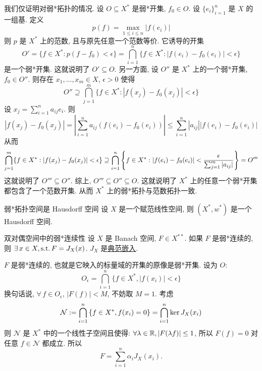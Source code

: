         \begin{prf}
            我们仅证明对弱*拓扑的情况. 设 \(O\subseteq X^*\) 是弱*开集, \(f_0\in O\). 设 \(\{e_i\}_{i=1}^n\) 是 \(X\) 的一组基. 定义
            \[p(f) = \max_{1\leq i\leq n} |f(e_i)|\]
            则 \(p\) 是 \(X^*\) 上的范数, 且与原先任意一个范数等价. 它诱导的开集
            \[O'=\{f\in X^*: p(f-f_0)<\epsilon\} = \bigcap_{i=1}^n \{f\in X^*: |f(e_i)-f_0(e_i)|<\epsilon\}\]
            是一个弱*开集. 这就说明了 \(O'\subseteq O\). 另一方面, 设 \(O''\) 是 \(X^*\) 上的一个弱*开集, \(f_0\in O''\). 则存在 \(x_1,\dots,x_m\in X\), \(\epsilon>0\) 使得
            \[O''\supseteq\bigcap_{j=1}^m \{f\in X^*: |f(x_j)-f_0(x_j)|<\epsilon\}\]
            设 \(x_j=\sum_{i=1}^n a_{ij} e_i\). 则
            \[|f(x_j)-f_0(x_j)| = \left|\sum_{i=1}^n a_{ij} (f(e_i)-f_0(e_i))\right| \leq \sum_{i=1}^n |a_{ij}| |f(e_i)-f_0(e_i)|\]
            从而
            \[\bigcap_{j=1}^m \{f\in X^*: |f(x_j)-f_0(x_j)|<\epsilon\} \supseteq \bigcap_{i=1}^n \qty{f\in X^*: |f(e_i)-f_0(e_i)|<\frac{\epsilon}{\sum_{j=1}^m |a_{ij}|}} = O'''\]
            这就说明了 \(O'''\subseteq O''\). 综上, \(O'''\subseteq O''\subseteq O\). 这就说明了 \(X^*\) 上的任意一个弱*开集都包含了一个范数开集. 从而 \(X^*\) 上的弱*拓扑与范数拓扑一致.
        \end{prf}

        \begin{ppt}
            {弱*拓扑空间是 Hausdorff 空间}
            设 \(X\) 是一个赋范线性空间, 则 \((X^*, w^*)\) 是一个 Hausdorff 空间.
        \end{ppt}

        \begin{ppt}
            {双对偶空间中的弱*连续性}
            设 \(X\) 是 Banach 空间, \(F\in X^{**}\). 如果 \(F\) 是弱*连续的, 则 \(\exists\,x\in X, \operatorname{\text{s.t.}} F=J_X(x)\). \(J_X\) 是\hyperref[dfn:canonical-embedding]{典范嵌入}.
        \end{ppt}

        \begin{prf}
            \(F\) 是弱*连续的, 也就是它映入的标量域的开集的原像是弱*开集. 设为 \(O\):
            \[O_\epsilon=\bigcap_{i=1}^{n}\{f\in X^*, |f(x_i)|<\epsilon \}\]
            换句话说, \(\forall\,f\in O_\epsilon\), \(|F(f)|<M\), 不妨取 \(M=1\). 考虑
            \[\mathcal{N}:=\bigcap_{i=1}^n \qty{f\in X^*, f(x_i)=0}=\bigcap_{i=1}^n\ker J_X(x_i) \]
            则 \(\mathcal{N}\) 是 \(X^*\) 中的一个线性子空间且使得: \(\forall \lambda\in\operatorname{\mathbb{R}}, |F(\lambda f)|\leq 1\), 所以 \(F(f)=0\) 对任意 \(f\in\mathcal{N}\) 都成立. 所以
            \[F = \sum_{i=1}^n \alpha_i J_X(x_i).\]
        \end{prf}

